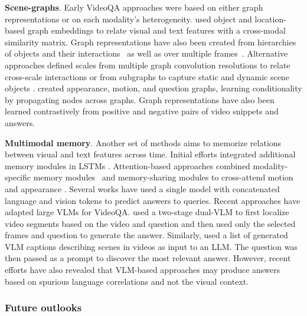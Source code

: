 \noindent
\textbf{Scene-graphs}. Early VideoQA approaches were based on either graph representations  or on each modality's heterogeneity.  used object and location-based graph embeddings to relate visual and text features with a cross-modal similarity matrix. Graph representations have also been created from hierarchies of objects and their interactions~ as well as over multiple frames~. Alternative approaches defined scales from multiple graph convolution resolutions to relate cross-scale interactions  or from subgraphs to capture static and dynamic scene objects  .  created appearance, motion, and question graphs, learning conditionality by propagating nodes across graphs. Graph representations have also been learned contrastively  from positive and negative pairs of video snippets and answers.


\noindent
\textbf{Multimodal memory}. Another set of methods aims to memorize relations between visual and text features across time. Initial efforts integrated additional memory modules in LSTMs . Attention-based approaches  combined modality-specific memory modules~ and memory-sharing modules to cross-attend motion and appearance . Several works  have used a single model with concatenated language and vision tokens to predict answers to queries. Recent approaches have adapted large VLMs for VideoQA.  used a two-stage dual-VLM to first localize video segments based on the video and question and then used only the selected frames and question to generate the answer. Similarly,  used a list of generated VLM captions describing scenes in videos as input to an LLM. The question was then passed as a prompt to discover the most relevant answer. However, recent efforts  have also revealed that VLM-based approaches may produce answers based on spurious language correlations and not the visual context.



\subsubsection{Future outlooks}
\label{sec:recognition::language:::outlooks}

